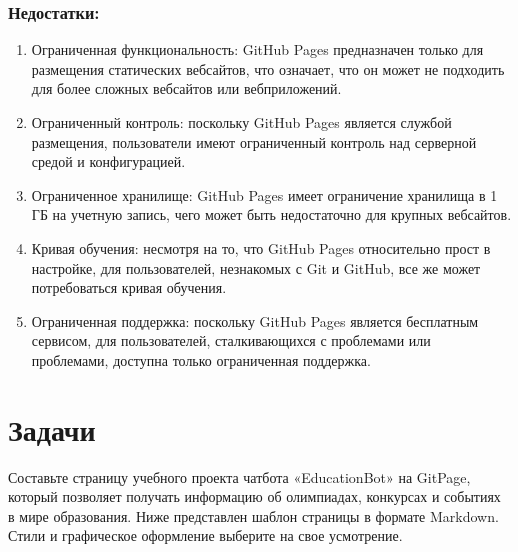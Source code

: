 \documentclass[letterpaper,10pt,russian]{sphinxmanual}
\begin{document}
\subsubsection{Недостатки:}
\label{\detokenize{educational_materials/github_pages/content:id4}}\begin{enumerate}
%
\item {} 
\sphinxAtStartPar
Ограниченная функциональность: GitHub Pages предназначен только для размещения статических веб\sphinxhyphen{}сайтов, что означает, что он может не подходить для более сложных веб\sphinxhyphen{}сайтов или веб\sphinxhyphen{}приложений.

\item {} 
\sphinxAtStartPar
Ограниченный контроль: поскольку GitHub Pages является службой размещения, пользователи имеют ограниченный контроль над серверной средой и конфигурацией.

\item {} 
\sphinxAtStartPar
Ограниченное хранилище: GitHub Pages имеет ограничение хранилища в 1 ГБ на учетную запись, чего может быть недостаточно для крупных веб\sphinxhyphen{}сайтов.

\item {} 
\sphinxAtStartPar
Кривая обучения: несмотря на то, что GitHub Pages относительно прост в настройке, для пользователей, незнакомых с Git и GitHub, все же может потребоваться кривая обучения.

\item {} 
\sphinxAtStartPar
Ограниченная поддержка: поскольку GitHub Pages является бесплатным сервисом, для пользователей, сталкивающихся с проблемами или проблемами, доступна только ограниченная поддержка.

\end{enumerate}

\sphinxstepscope


\section{Задачи}
\label{\detokenize{educational_materials/github_pages/exercises:id1}}\label{\detokenize{educational_materials/github_pages/exercises::doc}}
\sphinxAtStartPar
Составьте страницу учебного проекта чат\sphinxhyphen{}бота «EducationBot» на GitPage, который позволяет получать информацию об олимпиадах, конкурсах и событиях в мире образования. Ниже представлен шаблон страницы в формате Markdown. Стили и графическое оформление выберите на свое усмотрение.
\end{document}
